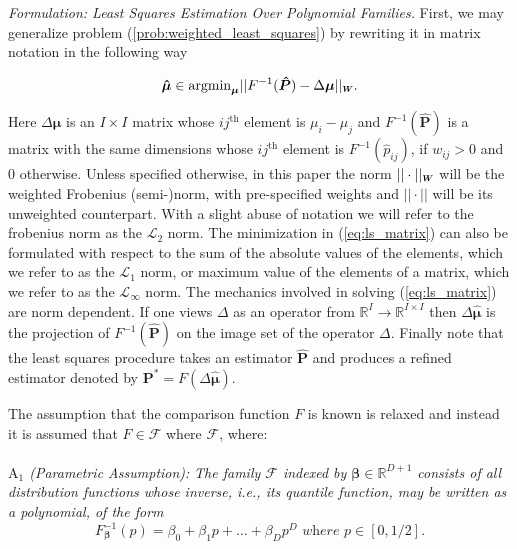 \documentclass[twoside,11pt]{article}
\newcommand*{\Scale}[2][4]{\scalebox{#1}{$#2$}}%
\begin{document}
\textit{Formulation: Least Squares Estimation Over Polynomial Families.} First, we may generalize problem (\ref{prob:weighted_least_squares}) by rewriting it in matrix notation in the following way

\begin{equation}
\label{eq:ls_matrix}
    \boldsymbol{\hat{\mu}}   \in \text{argmin}_{\boldsymbol{\mu}}  ||F^{-1} (\boldsymbol{\hat{P}}) - \Delta \boldsymbol{\mu} ||_{\Scale[.6]{\boldsymbol{W}}}.
\end{equation}

Here $\Delta \boldsymbol{\mu}$ is an $ I \times I$ matrix whose $ij^{\text{th}}$ element is $\mu_i - \mu_j$ and $F^{-1}(\boldsymbol{\hat P}) $ is a matrix with the same dimensions whose $ij^{\text{th}}$ element is $F^{-1}(\hat{p}_{ij})$, if $w_{ij}>0$ and $0$ otherwise. Unless specified otherwise, in this paper the norm $||\cdot||_{\Scale[.6]{\boldsymbol{W}}}$ will be the weighted Frobenius (semi-)norm, with pre-specified weights and $||\cdot||$ will be its unweighted counterpart. With a slight abuse of notation we will refer to the frobenius norm as the $\mathcal{L}_2$ norm. The minimization in (\ref{eq:ls_matrix}) can also be formulated with respect to the sum of the absolute values of the elements, which we refer to as the $\mathcal{L}_1$ norm, or maximum value of the elements of a matrix, which we refer to as the $\mathcal{L}_{\infty}$ norm. The mechanics involved in solving (\ref{eq:ls_matrix}) are norm dependent. If one views $\Delta$ as an operator from $\mathbb{R}^I \to \mathbb{R}^{I\times I}$ then $\Delta \boldsymbol{\hat \mu}$ is the projection of $F^{-1}(\boldsymbol{\hat P})$ on the image set of the operator $\Delta$. Finally note that the least squares procedure takes an estimator $\boldsymbol{\hat{P}}$ and produces a refined estimator denoted by $\boldsymbol{P}^*  = F\left(\Delta \boldsymbol{\hat \mu} \right)$.

The assumption that the comparison function $F$ is known is relaxed and instead it is assumed that $F \in \mathcal{F}$ where $\mathcal{F}$, where: \\
\\
\textit{$\mathrm{A}_1$ (Parametric Assumption):} 
\textit{The family $\mathcal{F}$ indexed by ${\boldsymbol{\beta}} \in \mathbb{R}^{D+1}$ consists of all distribution functions whose inverse, i.e., its quantile function, may be written as a polynomial, of the form }
\begin{equation}
\label{eq:F_inv}
    F^{-1}_{\boldsymbol{\beta}}(p) = \beta_0 + \beta_1 p +...+ \beta_Dp^D\textit{ where } p \in [0,1/2].
\end{equation}
\end{document}
